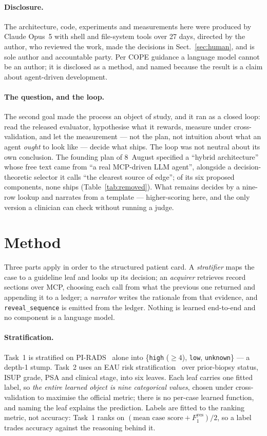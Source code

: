 \documentclass[runningheads]{llncs}
\newcommand{\code}[1]{\texttt{\small #1}}
\begin{document}
\paragraph{Disclosure.}
The architecture, code, experiments and measurements here were produced by Claude
Opus~5 with shell and file-system tools over 27 days, directed by the author, who
reviewed the work, made the decisions in Sect.~\ref{sec:human}, and is sole author and
accountable party. Per COPE guidance a language model cannot be an author; it is
disclosed as a method, and named because the result is a claim about agent-driven
development.

\paragraph{The question, and the loop.}
The second goal made the process an object of study, and it ran as a closed loop:
read the released evaluator, hypothesise what it rewards, measure under
cross-validation, and let the measurement --- not the plan, not intuition about what
an agent \emph{ought} to look like --- decide what ships. The loop was not neutral
about its own conclusion. The founding plan of 8~August specified a ``hybrid
architecture'' whose free text came from ``a real MCP-driven LLM agent'', alongside a
decision-theoretic selector it calls ``the clearest source of edge''; of its six
proposed components, none ships (Table~\ref{tab:removed}). What remains decides by a
nine-row lookup and narrates from a template --- higher-scoring here, and the only
version a clinician can check without running a judge.

\section{Method}
\label{sec:method}

Three parts apply in order to the structured patient card. A \emph{stratifier} maps
the case to a guideline leaf and looks up its decision; an \emph{acquirer} retrieves
record sections over MCP, choosing each call from what the previous one returned and
appending it to a ledger; a \emph{narrator} writes the rationale from that evidence,
and \code{reveal\_sequence} is emitted from the ledger. Nothing is learned end-to-end
and no component is a language model.

\paragraph{Stratification.}
Task~1 is stratified on PI-RADS~\cite{pirads} alone into \{\code{high} ($\geq 4$),
\code{low}, \code{unknown}\} --- a depth-1 stump. Task~2 uses an EAU risk
stratification~\cite{eau} over prior-biopsy status, ISUP grade, PSA and clinical
stage, into six leaves. Each leaf carries one fitted label, so \emph{the entire
learned object is nine categorical values}, chosen under cross-validation to maximise
the official metric; there is no per-case learned function, and naming the leaf
explains the prediction. Labels are fitted to the ranking metric, not accuracy: Task~1
ranks on $(\text{mean case score} + F_1^{\text{yes}})/2$, so a label trades accuracy
against the reasoning behind it.
\end{document}
